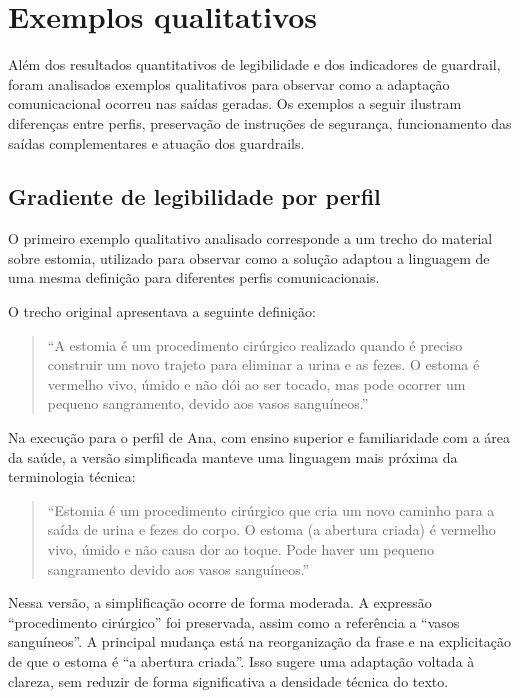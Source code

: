 \section{Exemplos qualitativos}
\label{sec:exemplos-qualitativos}

Além dos resultados quantitativos de legibilidade e dos indicadores de guardrail, foram analisados exemplos qualitativos para observar como a adaptação comunicacional ocorreu nas saídas geradas. Os exemplos a seguir ilustram diferenças entre perfis, preservação de instruções de segurança, funcionamento das saídas complementares e atuação dos guardrails.

\subsection{Gradiente de legibilidade por perfil}
\label{subsec:gradiente-legibilidade-perfil}

O primeiro exemplo qualitativo analisado corresponde a um trecho do material sobre estomia, utilizado para observar como a solução adaptou a linguagem de uma mesma definição para diferentes perfis comunicacionais.

O trecho original apresentava a seguinte definição:

\begin{quote}
``A estomia é um procedimento cirúrgico realizado quando é preciso construir um novo trajeto para eliminar a urina e as fezes. O estoma é vermelho vivo, úmido e não dói ao ser tocado, mas pode ocorrer um pequeno sangramento, devido aos vasos sanguíneos.''
\end{quote}

Na execução para o perfil de Ana, com ensino superior e familiaridade com a área da saúde, a versão simplificada manteve uma linguagem mais próxima da terminologia técnica:

\begin{quote}
``Estomia é um procedimento cirúrgico que cria um novo caminho para a saída de urina e fezes do corpo. O estoma (a abertura criada) é vermelho vivo, úmido e não causa dor ao toque. Pode haver um pequeno sangramento devido aos vasos sanguíneos.''
\end{quote}

Nessa versão, a simplificação ocorre de forma moderada. A expressão ``procedimento cirúrgico'' foi preservada, assim como a referência a ``vasos sanguíneos''. A principal mudança está na reorganização da frase e na explicitação de que o estoma é ``a abertura criada''. Isso sugere uma adaptação voltada à clareza, sem reduzir de forma significativa a densidade técnica do texto.

